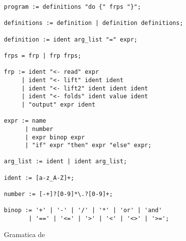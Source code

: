\begin{figure}[h!]
  \begin{center}
    \caption{Gramatica de \frob{}}
    \begin{Verbatim}[frame=single]
program := definitions "do {" frps "}";

definitions := definition | definition definitions;

definition := ident arg_list "=" expr;

frps = frp | frp frps;

frp := ident "<- read" expr
     | ident "<- lift" ident ident
     | ident "<- lift2" ident ident ident
     | ident "<- folds" ident value ident
     | "output" expr ident

expr := name
      | number
      | expr binop expr
      | "if" expr "then" expr "else" expr;

arg_list := ident | ident arg_list;

ident := [a-z_A-Z]+;

number := [-+]?[0-9]*\.?[0-9]+;

binop := '+' | '-' | '/' | '*' | 'or' | 'and'
       | '==' | '<=' | '>' | '<' | '<>' | '>=';
     \end{Verbatim}
   \label{fig:grammar}
   \end{center}
 \end{figure}
